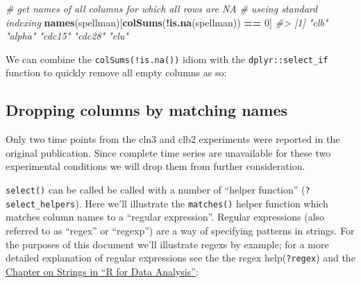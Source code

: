 \documentclass[]{book}
\newenvironment{Shaded}{\begin{snugshade}}{\end{snugshade}}
\newcommand{\CommentTok}[1]{\textcolor[rgb]{0.56,0.35,0.01}{\textit{#1}}}
\newcommand{\DecValTok}[1]{\textcolor[rgb]{0.00,0.00,0.81}{#1}}
\newcommand{\KeywordTok}[1]{\textcolor[rgb]{0.13,0.29,0.53}{\textbf{#1}}}
\newcommand{\NormalTok}[1]{#1}
\newcommand{\OperatorTok}[1]{\textcolor[rgb]{0.81,0.36,0.00}{\textbf{#1}}}
\newcommand{\StringTok}[1]{\textcolor[rgb]{0.31,0.60,0.02}{#1}}
\theoremstyle{definition}
\theoremstyle{definition}
\theoremstyle{definition}
\theoremstyle{remark}
\begin{document}
\begin{Shaded}
\begin{Highlighting}[]
\CommentTok{# get names of all columns for which all rows are NA}
\CommentTok{# useing standard indexing}
\KeywordTok{names}\NormalTok{(spellman)[}\KeywordTok{colSums}\NormalTok{(}\OperatorTok{!}\KeywordTok{is.na}\NormalTok{(spellman)) }\OperatorTok{==}\StringTok{ }\DecValTok{0}\NormalTok{]}
\CommentTok{#> [1] "clb"   "alpha" "cdc15" "cdc28" "elu"}
\end{Highlighting}
\end{Shaded}

We can combine the \texttt{colSums(!is.na())} idiom with the
\texttt{dplyr::select\_if} function to quickly remove all empty columns
as so:

\begin{Shaded}
\end{Shaded}

\hypertarget{dropping-columns-by-matching-names}{%
\subsection{Dropping columns by matching
names}\label{dropping-columns-by-matching-names}}

Only two time points from the cln3 and clb2 experiments were reported in
the original publication. Since complete time series are unavailable for
these two experimental conditions we will drop them from further
consideration.

\texttt{select()} can be called be called with a number of ``helper
function'' (\texttt{?select\_helpers}). Here we'll illustrate the
\texttt{matches()} helper function which matches column names to a
``regular expression''. Regular expressions (also referred to as
``regex'' or ``regexp'') are a way of specifying patterns in strings.
For the purposes of this document we'll illustrate regexs by example;
for a more detailed explanation of regular expressions see the the regex
help(\texttt{?regex}) and the
\href{http://r4ds.had.co.nz/strings.html}{Chapter on Strings in ``R for
Data Analysis''}:
\end{document}
